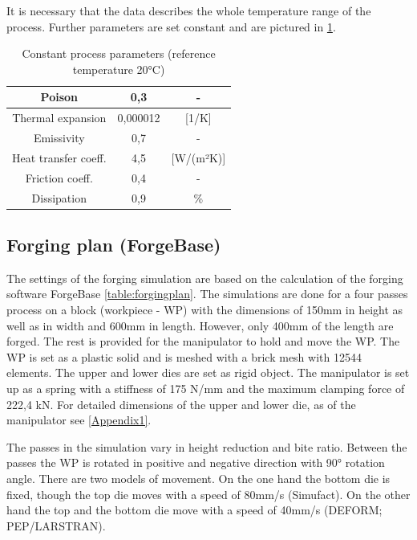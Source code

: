 It is necessary that the data describes the whole temperature range of the process. Further parameters are set constant and are pictured in \ref{table:processparameter}. 

\begin{table}[!htbp]%
 \centering
 \caption{Constant process parameters (reference temperature 20°C)}
 \begin{tabular}{|c|c|c|}
 \hline
 Poison&0,3&-\\
 \hline
 Thermal expansion&0,000012&[1/K]\\
 \hline
 Emissivity&0,7&-\\
 \hline
 Heat transfer coeff.&4,5&[W/(m²K)]\\
 \hline
 Friction coeff.&0,4&-\\
 \hline
 Dissipation&0,9&\%\\
 \hline
 \end{tabular}
 \label{table:processparameter}
\end{table}

\subsection{Forging plan (ForgeBase)}
The settings of the forging simulation are based on the calculation of the forging software ForgeBase \ref{table:forgingplan}. The simulations are done for a four passes process on a block (workpiece - WP) with the dimensions of 150mm in height as well as in width and 600mm in length. However, only 400mm of the length are forged. The rest is provided for the manipulator to hold and move the WP. The WP is set as a plastic solid and is meshed with a brick mesh with 12544 elements. The upper and lower dies are set as rigid object. The manipulator is set up as a spring with a stiffness of 175 N/mm and the maximum clamping force of 222,4 kN. For detailed dimensions of the upper and lower die, as of the manipulator see \ref{Appendix1}.\par 

The passes in the simulation vary in height reduction and bite ratio. Between the passes the WP is rotated in positive and negative direction with 90° rotation angle. There are two models of movement. On the one hand the bottom die is fixed, though the top die moves with a speed of 80mm/s (Simufact). On the other hand the top and the bottom die move with a speed of 40mm/s (DEFORM; PEP/LARSTRAN).


